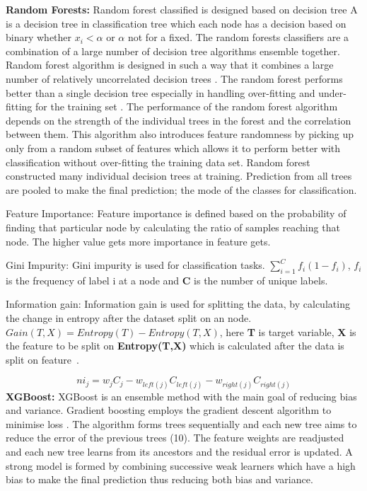 \begin{outline}
 \1 \textbf{Random Forests:} Random forest classified is designed based on decision tree A is a decision tree in classification tree which each node has a  decision based on binary whether  $x_i < \alpha$ or $\alpha$  not for a fixed. The random forests classifiers are a combination of a large number of decision tree algorithms \cite{breiman2001random} ensemble together. Random forest algorithm is designed in such a way that it combines a large number of relatively uncorrelated decision trees \cite{breiman2001random}. The random forest performs better than a single decision tree especially in handling over-fitting and under-fitting for the training set \cite{Mishra2021}. The performance of the random forest algorithm depends on the strength of the individual trees in the forest and the correlation between them. This algorithm also introduces feature randomness by picking up only from a random subset of features which allows it to perform better with classification without over-fitting the training data set. Random forest constructed many individual decision trees at training. Prediction from all trees are pooled to make the final prediction; the mode of the classes for classification.    
 
 \2 Feature Importance: Feature importance is defined based on the probability of finding that particular node by calculating the ratio of samples reaching that node. The higher value gets more importance in feature gets. 
 
 \2 Gini Impurity: Gini impurity is used for classification tasks. $\sum_{i=1}^{C} f_i{(1-f_i)}$, \textbf{$f_i$} is the frequency of label i at a node and \textbf{C} is the number of unique labels. 
 
 \2 Information gain: Information gain is used for splitting the data, by calculating the change in entropy after the dataset split on an node. $Gain(T,X) = Entropy(T) - Entropy(T,X)$, here \textbf{T} is target variable, \textbf{X} is the feature to be split on \textbf{Entropy(T,X)} which is calculated after the data is split on feature~\cite{breiman2001random}.
 
 $$ni_j =w_jC_j - w_{left(j)}C_{left(j)} - w_{right(j)}C_{right(j)}$$
 \1 \textbf{XGBoost:} XGBoost is an ensemble method with the main goal of reducing bias and variance. Gradient boosting employs the gradient descent algorithm to minimise loss \cite{Chen:2016:XST:2939672.2939785}. The algorithm forms trees sequentially and each new tree aims to reduce the error of the previous trees (10). The feature weights are readjusted and each new tree learns from its ancestors and the residual error is updated. A strong model is formed by combining successive weak learners which have a high bias to make the final prediction thus reducing both bias and variance.
 
\end{outline}


